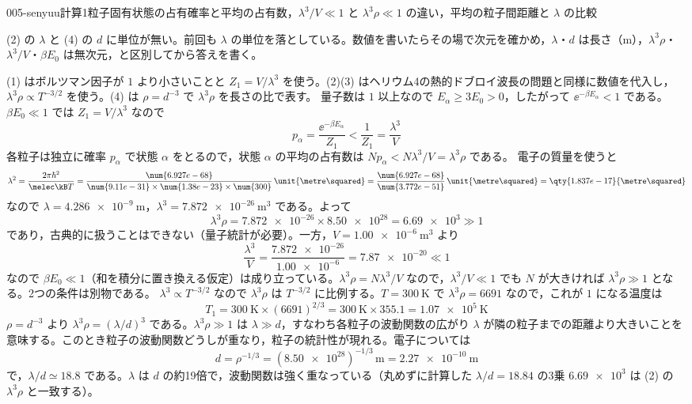 \documentclass[uplatex,dvipdfmx,a4paper,11pt]{jsarticle}
\begin{document}
\begin{mondai}{005-senyuu}{計算}{1粒子固有状態の占有確率と平均の占有数，$\lambda^{3}/V\ll1$ と $\lambda^{3}\rho\ll1$ の違い，平均の粒子間距離と $\lambda$ の比較}
\begin{kizuki}
\item {} (2) の $\lambda$ と (4) の $d$ に単位が無い。前回も $\lambda$ の単位を落としている。数値を書いたらその場で次元を確かめ，$\lambda$・$d$ は長さ（$\unit{\metre}$），$\lambda^{3}\rho$・$\lambda^{3}/V$・$\beta E_0$ は無次元，と区別してから答えを書く。
\end{kizuki}
\begin{tadashii}
\houshin (1) はボルツマン因子が $1$ より小さいことと $Z_1=V/\lambda^{3}$ を使う。(2)(3) はヘリウム4の熱的ドブロイ波長の問題と同様に数値を代入し，$\lambda^{3}\rho\propto T^{-3/2}$ を使う。(4) は $\rho=d^{-3}$ で $\lambda^{3}\rho$ を長さの比で表す。
\keisan {} 量子数は $1$ 以上なので $E_\alpha\ge3E_0>0$，したがって $\ee^{-\beta E_\alpha}<1$ である。$\beta E_0\ll1$ では $Z_1=V/\lambda^{3}$ なので
\[ p_\alpha=\frac{\ee^{-\beta E_\alpha}}{Z_1}<\frac{1}{Z_1}=\frac{\lambda^{3}}{V} \]
各粒子は独立に確率 $p_\alpha$ で状態 $\alpha$ をとるので，状態 $\alpha$ の平均の占有数は $Np_\alpha<N\lambda^{3}/V=\lambda^{3}\rho$ である。
 電子の質量を使うと
\[ \lambda^{2}=\frac{2\pi\hbar^{2}}{\melec\kB T}=\frac{\num{6.927e-68}}{\num{9.11e-31}\times\num{1.38e-23}\times\num{300}}\,\unit{\metre\squared}=\frac{\num{6.927e-68}}{\num{3.772e-51}}\,\unit{\metre\squared}=\qty{1.837e-17}{\metre\squared} \]
なので $\lambda=\qty{4.286e-9}{\metre}$，$\lambda^{3}=\qty{7.872e-26}{\metre\cubed}$ である。よって
\[ \lambda^{3}\rho=\num{7.872e-26}\times\num{8.50e28}=\num{6.69e3}\gg1 \]
であり，古典的に扱うことはできない（量子統計が必要）。一方，$V=\qty{1.00e-6}{\metre\cubed}$ より
\[ \frac{\lambda^{3}}{V}=\frac{\num{7.872e-26}}{\num{1.00e-6}}=\num{7.87e-20}\ll1 \]
なので $\beta E_0\ll1$（和を積分に置き換える仮定）は成り立っている。$\lambda^{3}\rho=N\lambda^{3}/V$ なので，$\lambda^{3}/V\ll1$ でも $N$ が大きければ $\lambda^{3}\rho\gg1$ となる。2つの条件は別物である。
 $\lambda^{3}\propto T^{-3/2}$ なので $\lambda^{3}\rho$ は $T^{-3/2}$ に比例する。$T=\qty{300}{\kelvin}$ で $\lambda^{3}\rho=\num{6691}$ なので，これが $1$ になる温度は
\[ T_1=\qty{300}{\kelvin}\times(\num{6691})^{2/3}=\qty{300}{\kelvin}\times\num{355.1}=\qty{1.07e5}{\kelvin} \]
 $\rho=d^{-3}$ より $\lambda^{3}\rho=(\lambda/d)^{3}$ である。$\lambda^{3}\rho\gg1$ は $\lambda\gg d$，すなわち各粒子の波動関数の広がり $\lambda$ が隣の粒子までの距離より大きいことを意味する。このとき粒子の波動関数どうしが重なり，粒子の統計性が現れる。電子については
\[ d=\rho^{-1/3}=(\num{8.50e28})^{-1/3}\,\unit{\metre}=\qty{2.27e-10}{\metre} \]
で，$\lambda/d\simeq\num{18.8}$ である。$\lambda$ は $d$ の約19倍で，波動関数は強く重なっている（丸めずに計算した $\lambda/d=\num{18.84}$ の3乗 $\num{6.69e3}$ は (2) の $\lambda^{3}\rho$ と一致する）。

\end{tadashii}
\end{mondai}
\end{document}
